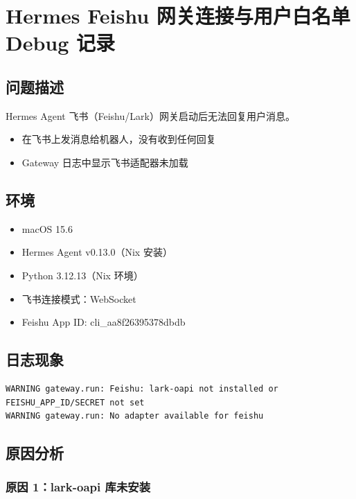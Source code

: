 \section{Hermes Feishu 网关连接与用户白名单 Debug 记录}

\subsection{问题描述}

Hermes Agent 飞书（Feishu/Lark）网关启动后无法回复用户消息。

\begin{itemize}
  \item 在飞书上发消息给机器人，没有收到任何回复
  \item Gateway 日志中显示飞书适配器未加载
\end{itemize}

\subsection{环境}

\begin{itemize}
  \item macOS 15.6
  \item Hermes Agent v0.13.0（Nix 安装）
  \item Python 3.12.13（Nix 环境）
  \item 飞书连接模式：WebSocket
  \item Feishu App ID: cli\_aa8f26395378dbdb
\end{itemize}

\subsection{日志现象}

\begin{lstlisting}
WARNING gateway.run: Feishu: lark-oapi not installed or FEISHU_APP_ID/SECRET not set
WARNING gateway.run: No adapter available for feishu
\end{lstlisting}

\subsection{原因分析}

\subsubsection{原因 1：lark-oapi 库未安装}


